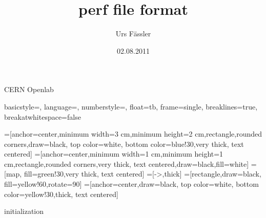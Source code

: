 
\usepackage[utf8]{inputenc}
\usepackage{amsmath}
\usepackage{amsfonts}
\usepackage{amssymb}
\usepackage{multicol}
\usepackage{graphicx}
\usepackage{tikz}
\usetikzlibrary{arrows,positioning,shapes}
\usepackage{listings}
\usepackage{multicol}
\usepackage{appendixnumberbeamer}
\usepackage{pstricks}
\usepackage{marvosym}
\usepackage[backend=bibtex]{biblatex}

\newcommand{\code}[1]{\texttt{#1}}

\title{perf file format}
\author{Urs F\"assler}
\date{02.08.2011}
\institute
{
  CERN Openlab
}

\lstset
{  
  basicstyle=\small\ttfamily,
  language=,
  numberstyle={\color{Grey}},
  float=tb,
  frame=single,
  breaklines=true, %
  breakatwhitespace=false %
}

%


\beamertemplatenavigationsymbolsempty


\begin{frame}[plain]
  \titlepage
\end{frame}

\setcounter{framenumber}{0}

=[anchor=center,minimum width=3 cm,minimum height=2 cm,rectangle,rounded corners,draw=black, top color=white, bottom color=blue!30,very thick, text centered]
=[anchor=center,minimum width=1 cm,minimum height=1 cm,rectangle,rounded corners,very thick, text centered,draw=black,fill=white]
=[map, fill=green!30,very thick, text centered]
=[->,thick]
=[rectangle,draw=black, fill=yellow!60,rotate=90]
=[anchor=center,draw=black, top color=white, bottom color=yellow!30,thick, text centered]

\begin{frame}{initialization}
\begin{center}
\end{center}
\end{frame}

